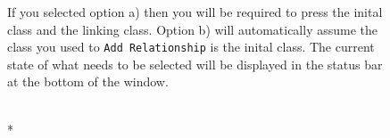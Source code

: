 \documentclass[a4paper]{article}
\begin{document}
{\begin{figure}[H]
If you selected option a) then you will be required to press the inital class and the linking class. Option b) will automatically assume the class you used to \texttt{Add Relationship} is the inital class. The current state of
what needs to be selected will be displayed in the status bar at the bottom of the window.
\begin{center}

 \imagespace
{}\\*

\end{center}
\end{figure}}
\end{document}

